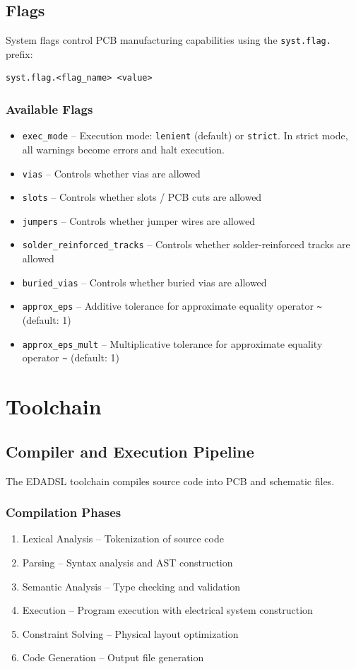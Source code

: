 \documentclass{report}
\begin{document}
\chapter{Flags}
System flags control PCB manufacturing capabilities using the \texttt{syst.flag.} prefix:
\begin{verbatim}
syst.flag.<flag_name> <value>
\end{verbatim}

\section{Available Flags}
\begin{itemize}
\item \texttt{exec\_mode} -- Execution mode: \texttt{lenient} (default) or \texttt{strict}. In strict mode, all warnings become errors and halt execution.
\item \texttt{vias} -- Controls whether vias are allowed
\item \texttt{slots} -- Controls whether slots / PCB cuts are allowed
\item \texttt{jumpers} -- Controls whether jumper wires are allowed
\item \texttt{solder\_reinforced\_tracks} -- Controls whether solder-reinforced tracks are allowed
\item \texttt{buried\_vias} -- Controls whether buried vias are allowed
\item \texttt{approx\_eps} -- Additive tolerance for approximate equality operator \texttt{\textasciitilde} (default: 1)
\item \texttt{approx\_eps\_mult} -- Multiplicative tolerance for approximate equality operator \texttt{\textasciitilde*} (default: 1)
\end{itemize}


\part{Toolchain}
\chapter{Compiler and Execution Pipeline}
The EDADSL toolchain compiles source code into PCB and schematic files.

\section{Compilation Phases}
\begin{enumerate}
\item Lexical Analysis -- Tokenization of source code
\item Parsing -- Syntax analysis and AST construction
\item Semantic Analysis -- Type checking and validation
\item Execution -- Program execution with electrical system construction
\item Constraint Solving -- Physical layout optimization
\item Code Generation -- Output file generation
\end{enumerate}
\end{document}
